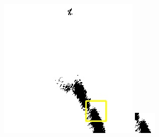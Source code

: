 \documentclass[10pt,UTF8,fntef]{ctexart}
\begin{document}
\begin{figure}[H]
{{\begin{minipage}[b]{0.15\linewidth}
            \includegraphics[width=1\linewidth]{../log/spoon3/cut/LC81321192014054LGN00_03249_my.jpg}\vspace{4pt}
            \includegraphics[width=1\linewidth]{../log/spoon3/cut/tmp_cut_LC81321192014054LGN00_03249_my.jpg}\vspace{4pt}

\end{minipage}}}
\end{figure}
\end{document}
